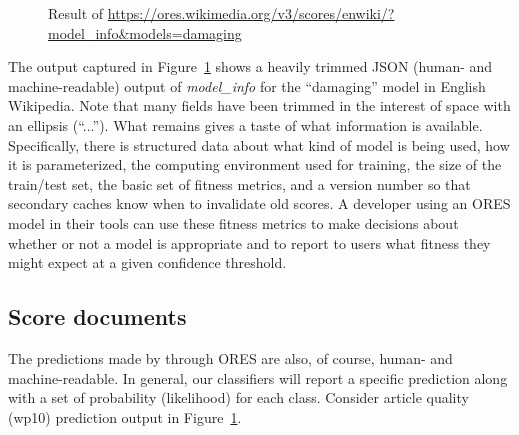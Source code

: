 \begin{figure}[htbp]
        \caption{Result of \url{https://ores.wikimedia.org/v3/scores/enwiki/?model_info&models=damaging}}
        \label{fig:english_damaging_model_info}
\end{figure}


The output captured in Figure~\ref{fig:english_damaging_model_info} shows a heavily trimmed JSON (human- and machine-readable) output of \emph{model\_info} for the ``damaging'' model in English Wikipedia.  Note that many fields have been trimmed in the interest of space with an ellipsis (``...'').  What remains gives a taste of what information is available.  Specifically, there is structured data about what kind of model is being used, how it is parameterized, the computing environment used for training, the size of the train/test set, the basic set of fitness metrics, and a version number so that secondary caches know when to invalidate old scores.  A developer using an ORES model in their tools can use these fitness metrics to make decisions about whether or not a model is appropriate and to report to users what fitness they might expect at a given confidence threshold.

\subsection{Score documents}
The predictions made by through ORES are also, of course, human- and machine-readable.  In general, our classifiers will report a specific prediction along with a set of probability (likelihood) for each class.  Consider article quality (wp10) prediction output in Figure~\ref{fig:english_damaging_model_info}.

